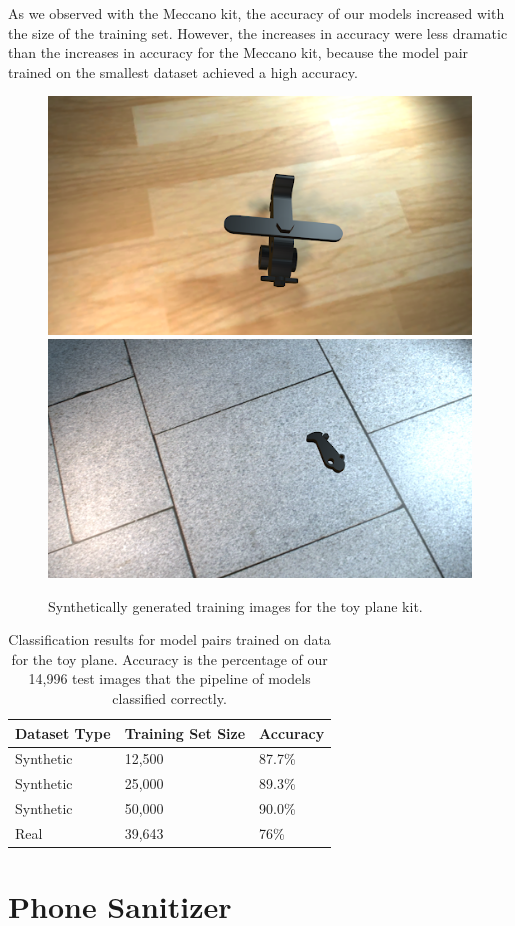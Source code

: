 As we observed with the Meccano kit, the accuracy of our models increased with
the size of the training set.
However, the increases in accuracy were less dramatic than the increases in
accuracy for the Meccano kit, because the model pair trained on the smallest
dataset achieved a high accuracy.

\begin{figure}
  \includegraphics[width=0.5\columnwidth]{figures/synthetic/plane_train1.png}
  \includegraphics[width=0.5\columnwidth]{figures/synthetic/plane_train2.png}
  \caption{
    Synthetically generated training images for the toy plane kit.
  }\label{fig:plane_train}
\end{figure}

\begin{table}
\begin{tabular}{|l||l|l|}
\hline
  Dataset Type & Training Set Size & Accuracy\\
  \hline
  \hline
  Synthetic & 12,500 & 87.7\%\\
  Synthetic & 25,000 & 89.3\%\\
  Synthetic & 50,000 & 90.0\%\\
  \hline
  Real & 39,643 & 76\%\\
\hline
\end{tabular}
  \caption{
    Classification results for model pairs trained on data for the toy plane.
    Accuracy is the percentage of our 14,996 test images that the pipeline of
    models classified correctly.
  }\label{tab:plane_accuracy}
\end{table}

\section{Phone Sanitizer}

